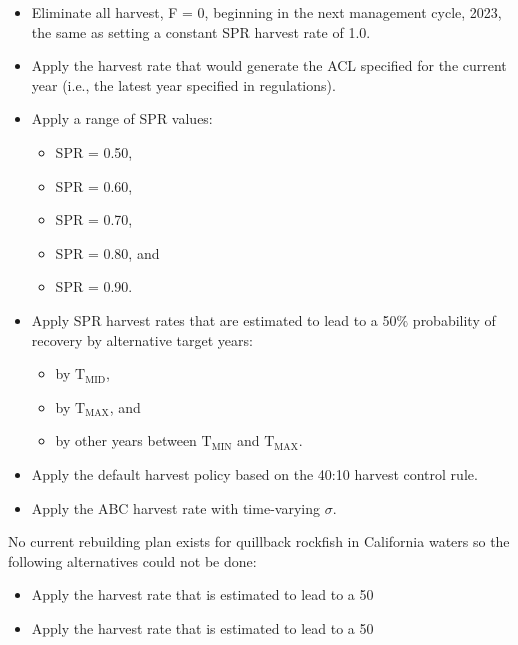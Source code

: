 \documentclass[11pt,
  english,
  a4paper,
]{article}
\begin{document}
\begin{itemize}
    \item Eliminate all harvest, F = 0, beginning in the next management cycle, 2023, the same as setting a constant SPR harvest rate of 1.0.
    \item Apply the harvest rate that would generate the ACL specified for the current year (i.e., the latest year specified in regulations).
    \item Apply a range of SPR values: 
    \begin{itemize}
     \item SPR = 0.50,
     \item SPR = 0.60,
     \item SPR = 0.70,
     \item SPR = 0.80, and
     \item SPR = 0.90. 
    \end{itemize}
    \item Apply SPR harvest rates that are estimated to lead to a 50$\%$ probability of recovery by alternative target years: 
    \begin{itemize}
     \item by $\text{T}_\text{MID}$, 
     \item by $\text{T}_\text{MAX}$, and 
     \item by other years between $\text{T}_\text{MIN}$ and $\text{T}_\text{MAX}$.
    \end{itemize}
    \item Apply the default harvest policy based on the 40:10 harvest control rule.
    \item Apply the ABC harvest rate with time-varying $\sigma$.
\end{itemize}


No current rebuilding plan exists for quillback rockfish in California waters so the following alternatives could not be done:

\leavevmode\tagmcend\tagstructend\par

\begin{itemize}
 \item Apply the harvest rate that is estimated to lead to a 50%
 \item Apply the harvest rate that is estimated to lead to a 50%
\end{itemize}
\end{document}

